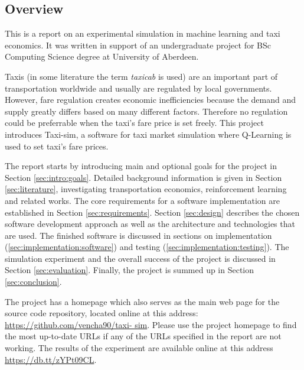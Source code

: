 \subsection{Overview}
\label{sec:intro:overview}

This is a report on an experimental simulation in machine learning and taxi
economics. It was written in support of an undergraduate project for BSc
Computing Science degree at University of Aberdeen.

Taxis (in some literature the term \textit{taxicab} is used) are an important
part of transportation worldwide and usually are regulated by local
governments. However, fare regulation creates economic inefficiencies because
the demand and supply greatly differs based on many different factors.
Therefore no regulation could be preferrable when the taxi's fare price is set
freely. This project introduces Taxi-sim, a software for taxi market simulation
where Q-Learning is used to set taxi's fare prices.

The report starts by introducing main and optional goals for the project in
Section \ref{sec:intro:goals}. Detailed background information is given in
Section \ref{sec:literature}, investigating transportation economics,
reinforcement learning and related works. The core requirements for a software
implementation are established in Section \ref{sec:requirements}. Section
\ref{sec:design} describes the chosen software development approach as well as
the architecture and technologies that are used. The finished software is
discussed in sections on implementation (\ref{sec:implementation:software}) and
testing (\ref{sec:implementation:testing}). The simulation experiment and the
overall success of the project is discussed in Section \ref{sec:evaluation}.
Finally, the project is summed up in Section \ref{sec:conclusion}.

The project has a homepage which also serves as the main web page for the
source code repository, located online at this address:
\url{https://github.com/vencha90/taxi- sim}. Please use the project homepage to
find the most up-to-date URLs if any of the URLs specified in the report are
not working. The results of the experiment are available online at this address
\url{https://db.tt/zYPt09CL}.
